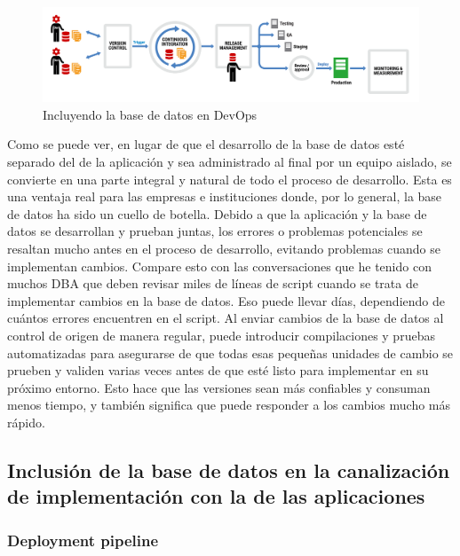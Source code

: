 \documentclass[preprint,12pt]{elsarticle}
\begin{document}
\begin{figure}[htb]
	\begin{center}
		\includegraphics[width=14cm]{./IMAGENES/basededatos_1} 
		\caption{Incluyendo la base de datos en DevOps}
	\end{center}
\end{figure}

Como se puede ver, en lugar de que el desarrollo de la base de datos esté separado del de la aplicación y sea administrado al final por un equipo aislado, se convierte en una parte integral y natural de todo el proceso de desarrollo. Esta es una ventaja real para las empresas e instituciones donde, por lo general, la base de datos ha sido un cuello de botella. Debido a que la aplicación y la base de datos se desarrollan y prueban juntas, los errores o problemas potenciales se resaltan mucho antes en el proceso de desarrollo, evitando problemas cuando se implementan cambios. Compare esto con las conversaciones que he tenido con muchos DBA que deben revisar miles de líneas de script cuando se trata de implementar cambios en la base de datos. Eso puede llevar días, dependiendo de cuántos errores encuentren en el script. Al enviar cambios de la base de datos al control de origen de manera regular, puede introducir compilaciones y pruebas automatizadas para asegurarse de que todas esas pequeñas unidades de cambio se prueben y validen varias veces antes de que esté listo para implementar en su próximo entorno. Esto hace que las versiones sean más confiables y consuman menos tiempo, y también significa que puede responder a los cambios mucho más rápido. \cite{DevopsBD2}

\subsection{\textbf{Inclusión de la base de datos en la canalización de implementación con la de las aplicaciones}}

\subsubsection{\textbf{Deployment pipeline}}
\end{document}
